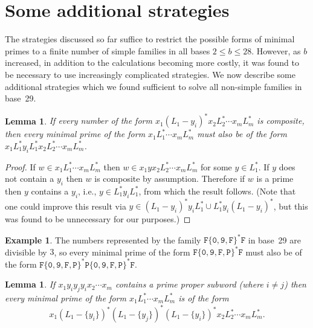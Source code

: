 \documentclass[12pt]{article}
\theoremstyle{plain}
\newtheorem{lemma}[theorem]{Lemma}
\theoremstyle{definition}
\newtheorem{example}[theorem]{Example}
\newcommand{\0}{\mathtt{0}}
\newcommand{\1}{\mathtt{1}}
\newcommand{\2}{\mathtt{2}}
\newcommand{\3}{\mathtt{3}}
\newcommand{\4}{\mathtt{4}}
\newcommand{\5}{\mathtt{5}}
\newcommand{\6}{\mathtt{6}}
\newcommand{\7}{\mathtt{7}}
\newcommand{\8}{\mathtt{8}}
\newcommand{\9}{\mathtt{9}}
\begin{document}
\section{Some additional strategies}\label{addstrat}

The strategies discussed so far suffice to restrict the possible forms of minimal primes to a finite number of simple families in all bases $2\leq b\leq 28$.
However, as $b$ increased, in addition to the calculations becoming more costly, 
it was found to be necessary to use increasingly complicated strategies.
We now describe some additional strategies which we found sufficient to solve all non-simple families in base~29.
\begin{lemma}
If every number of the form $x_1(L_1-y_i)^*x_2L_2^*\dotsm x_mL_m^*$ is composite, then
every minimal prime of the form $x_1L_1^*\dotsm x_mL_m^*$ must also be of the form
$x_1L_1^*y_iL_1^*x_2L_2^*\dotsm x_mL_m^*$.
\end{lemma}
\begin{proof}
If $w\in x_1L_1^*\dotsm x_mL_m^*$ then $w\in x_1yx_2L_2^*\dotsm x_mL_m^*$ for some $y\in L_1^*$.  If $y$ does not contain a $y_i$
then $w$ is composite by assumption.  Therefore if $w$ is a prime then $y$ contains a $y_i$, i.e., $y\in L_1^*y_iL_1^*$, from which the
result follows.
(Note that one could improve this result via $y\in(L_1-y_i)^*y_iL_1^*\cup L_1^*y_i(L_1-y_i)^*$, but this was found to be unnecessary for our purposes.)
\end{proof}
\begin{example}
The numbers represented by the family $\mathtt{F}\{\0,\9,\mathtt{F}\}^*\mathtt{F}$ in base~29 are divisible by $3$,
so every minimal prime of the form $\mathtt{F}\{\0,\9,\mathtt{F},\mathtt{P}\}^*\mathtt{F}$ must also be of the form
$\mathtt{F}\{\0,\9,\mathtt{F},\mathtt{P}\}^*\mathtt{P}\{\0,\9,\mathtt{F},\mathtt{P}\}^*\mathtt{F}$.
\end{example}
\begin{lemma}
If $x_1y_iy_jy_ix_2\dotsm x_m$ contains a prime proper subword (where $i\neq j$) then every minimal prime of the form
$x_1L_1^*\dotsm x_mL_m^*$ is of the form \[x_1(L_1-\{y_i\})^*(L_1-\{y_j\})^*(L_1-\{y_i\})^*x_2L_2^*\dotsm x_mL_m^* . \]
\end{lemma}
\end{document}
